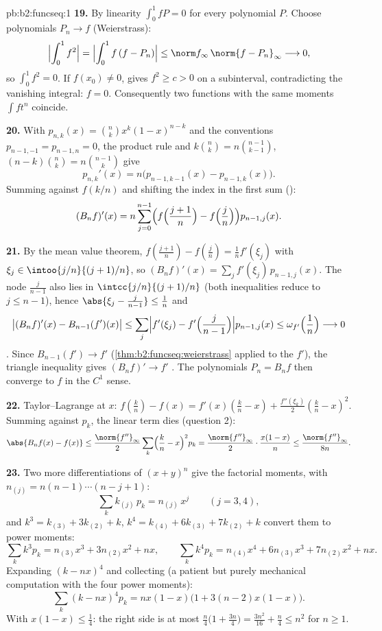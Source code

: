 \begin{solution}{pb:b2:funcseq:1}
\textbf{19.} By linearity $\int_0^1 fP = 0$ for every
polynomial $P$. Choose polynomials $P_n \to f$ 
(Weierstrass):
\[
\Bigl|\int_0^1 f^2\Bigr|
= \Bigl|\int_0^1 f\,(f - P_n)\Bigr|
\leq \norm f_\infty\,\norm{f - P_n}_\infty
\longrightarrow 0 ,
\]
so $\int_0^1 f^2 = 0$. If $f(x_0) \neq 0$,  gives
$f^2 \geq c > 0$ on a subinterval, contradicting the vanishing
integral: $f = 0$. Consequently two  functions with
the same moments $\int f t^n$ coincide.

\textbf{20.} With $p_{n,k}(x) = \binom nk x^k(1-x)^{n-k}$ and
the conventions $p_{n-1,-1} = p_{n-1,n} = 0$, the product rule
and $k\binom nk = n\binom{n-1}{k-1}$, $(n-k)\binom nk =
n\binom{n-1}{k}$ give
\[
p_{n,k}'(x) = n\bigl(p_{n-1,k-1}(x) - p_{n-1,k}(x)\bigr) .
\]
Summing against $f(k/n)$ and shifting the index in the first
sum ():
\[
(B_nf)'(x) = n\sum_{j=0}^{n-1}\Bigl(f\Bigl(\frac{j+1}n\Bigr)
- f\Bigl(\frac jn\Bigr)\Bigr)p_{n-1,j}(x) .
\]

\textbf{21.} By the mean value theorem, $f(\frac{j+1}n) -
f(\frac jn) = \frac1n f'(\xi_j)$ with $\xi_j \in
\intoo{j/n}{(j+1)/n}$, so $(B_nf)'(x) = \sum_j
f'(\xi_j)\,p_{n-1,j}(x)$. The node $\frac{j}{n-1}$ also lies in
$\intcc{j/n}{(j+1)/n}$ (both inequalities reduce to $j \leq
n-1$), hence $\abs{\xi_j - \frac j{n-1}} \leq \frac1n$ and
\[
\bigl|(B_nf)'(x) - B_{n-1}(f')(x)\bigr|
\leq \sum_j\Bigl|f'(\xi_j) -
f'\Bigl(\frac{j}{n-1}\Bigr)\Bigr| p_{n-1,j}(x)
\leq \omega_{f'}\Bigl(\frac1n\Bigr) \longrightarrow 0
\]
. Since $B_{n-1}(f') \to f'$ 
(\cref{thm:b2:funcseq:weierstrass} applied to the 
$f'$), the triangle inequality gives $(B_nf)' \to f'$
. The polynomials $P_n = B_nf$ then converge to $f$
in the $C^1$ sense.

\textbf{22.} Taylor--Lagrange at $x$: $f(\frac kn) - f(x) =
f'(x)(\frac kn - x) + \frac{f''(\xi_k)}2(\frac kn - x)^2$.
Summing against $p_k$, the linear term dies (question 2):
\[
\abs{B_nf(x) - f(x)}
\leq \frac{\norm{f''}_\infty}{2}\sum_k\Bigl(\frac kn -
x\Bigr)^2p_k
= \frac{\norm{f''}_\infty}{2}\cdot\frac{x(1-x)}{n}
\leq \frac{\norm{f''}_\infty}{8n} .
\]

\textbf{23.} Two more differentiations of $(x+y)^n$ give the
factorial moments, with $n_{(j)} = n(n-1)\cdots(n-j+1)$:
\[
\sum_k k_{(j)}\,p_k = n_{(j)}\,x^j \qquad (j = 3, 4),
\]
and $k^3 = k_{(3)} + 3k_{(2)} + k$, $k^4 = k_{(4)} + 6k_{(3)} +
7k_{(2)} + k$ convert them to power moments:
\[
\sum_k k^3p_k = n_{(3)}x^3 + 3n_{(2)}x^2 + nx,
\qquad
\sum_k k^4p_k = n_{(4)}x^4 + 6n_{(3)}x^3 + 7n_{(2)}x^2 + nx .
\]
Expanding $(k - nx)^4$ and collecting (a patient but purely
mechanical computation with the four power moments):
\[
\sum_k(k-nx)^4p_k = nx(1-x)\bigl(1 + 3(n-2)x(1-x)\bigr) .
\]
With $x(1-x) \leq \frac14$: the right side is at most
$\frac n4\bigl(1 + \frac{3n}4\bigr) = \frac{3n^2}{16} +
\frac n4 \leq n^2$ for $n \geq 1$.


\end{solution}

